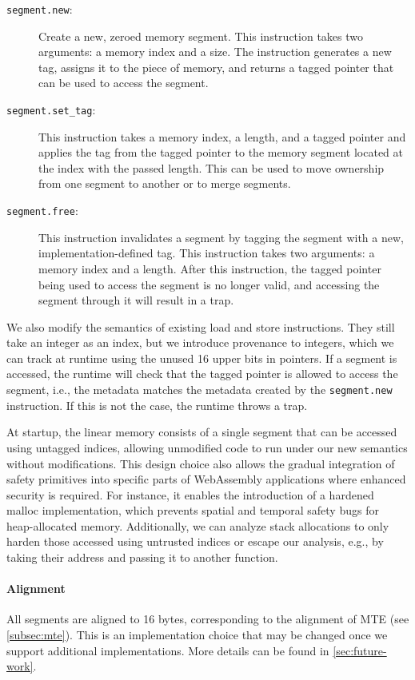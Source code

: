 \begin{description}
    \item[\texttt{segment.new}:] Create a new, zeroed memory segment.
    This instruction takes two arguments: a memory index and a size.
    The instruction generates a new tag, assigns it to the piece of memory, and returns a tagged pointer that can be used to access the segment.
    \item[\texttt{segment.set\_tag}:] This instruction takes a memory index, a length, and a tagged pointer and applies the tag from the tagged pointer to the memory segment located at the index with the passed length.
    This can be used to move ownership from one segment to another or to merge segments.
    \item[\texttt{segment.free}:] This instruction invalidates a segment by tagging the segment with a new, implementation-defined tag.
    This instruction takes two arguments: a memory index and a length.
    After this instruction, the tagged pointer being used to access the segment is no longer valid, and accessing the segment through it will result in a trap.
\end{description}

We also modify the semantics of existing load and store instructions.
They still take an integer as an index, but we introduce provenance to integers, which we can track at runtime using the unused 16 upper bits in pointers.
If a segment is accessed, the runtime will check that the tagged pointer is allowed to access the segment, i.e., the metadata matches the metadata created by the \texttt{segment.new} instruction.
If this is not the case, the runtime throws a trap.

At startup, the linear memory consists of a single segment that can be accessed using untagged indices, allowing unmodified code to run under our new semantics without modifications.
This design choice also allows the gradual integration of safety primitives into specific parts of WebAssembly applications where enhanced security is required.
For instance, it enables the introduction of a hardened malloc implementation, which prevents spatial and temporal safety bugs for heap-allocated memory.
Additionally, we can analyze stack allocations to only harden those accessed using untrusted indices or escape our analysis, e.g., by taking their address and passing it to another function.

\paragraph{Alignment}
All segments are aligned to 16 bytes, corresponding to the alignment of \ac{MTE} (see \cref{subsec:mte}).
This is an implementation choice that may be changed once we support additional implementations.
More details can be found in \cref{sec:future-work}.

